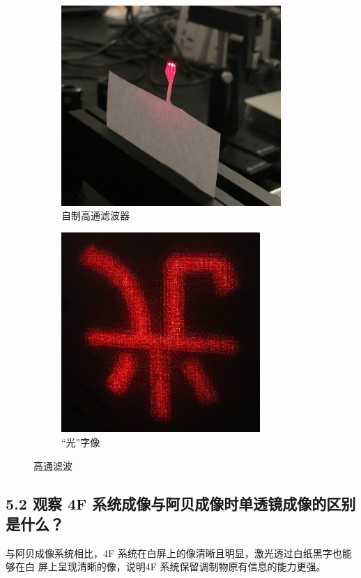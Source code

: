 \documentclass[UTF8]{article}
\theoremstyle{MyLineTheoremStyle} %
\theoremstyle{MyBlockTheoremStyle} %
\theoremstyle{MySubsubsectionStyle} %
\begin{document}
\begin{figure}[H]\centering
\begin{subfigure}[b]{0.5\columnwidth}\centering
    \includegraphics[height=215pt]{assets/1 阿贝尔/自制高通滤波器.jpg}
    \caption{自制高通滤波器}
\end{subfigure}\hfill
\begin{subfigure}[b]{0.5\columnwidth}\centering
    \includegraphics[height=215pt]{assets/1 阿贝尔/光 高通.png}
    \caption{“光”字像}
\end{subfigure}
\caption{高通滤波}\label{高通滤波}
\end{figure}


\subsection*{5.2 观察 4F 系统成像与阿贝成像时单透镜成像的区别是什么？}
与阿贝成像系统相比，4F 系统在白屏上的像清晰且明显，激光透过白纸黑字也能够在白
屏上呈现清晰的像，说明4F 系统保留调制物原有信息的能力更强。
\end{document}
